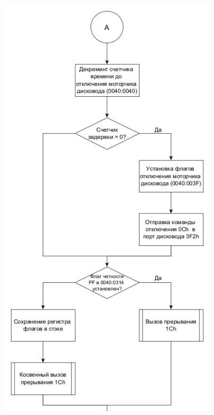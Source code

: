 \begin{figure}[!ht]
    \begin{center}
        \includegraphics[width=12cm]{img/int8h.2.1}
    \end{center}
\end{figure}

\clearpage
\newpage

